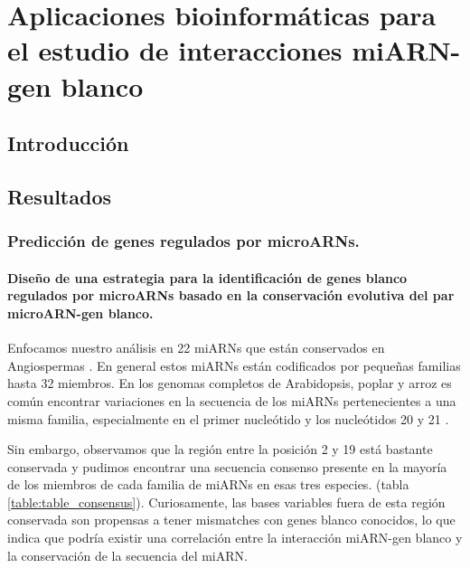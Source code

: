 
\chapter{Aplicaciones bioinformáticas para el estudio de interacciones miARN-gen blanco} 

\ifpdf
    \graphicspath{{Chapter1/Figs/Raster/}{Chapter1/Figs/PDF/}{Chapter1/Figs/}}
\else
    \graphicspath{{Chapter1/Figs/Vector/}{Chapter1/Figs/}}
\fi

\section{Introducción}


\section{Resultados} 

\subsection{Predicción de genes regulados por microARNs.} %
\subsubsection{Diseño de una estrategia para la identificación de genes blanco regulados por microARNs basado en la conservación evolutiva del par microARN-gen blanco.}

Enfocamos nuestro análisis en 22 miARNs que están conservados en Angiospermas \citep{citeulike:8816489,10.1371/journal.pgen.1002419}.  En general estos miARNs están codificados por pequeñas familias hasta 32 miembros. En los genomas completos de Arabidopsis, poplar y arroz es común encontrar variaciones en la secuencia de los miARNs pertenecientes a una misma familia, especialmente en el primer nucleótido y los nucleótidos 20 y 21 \citep{10.1371/journal.pgen.1002419}.

Sin embargo, observamos que la región entre la posición 2 y 19 está bastante conservada y pudimos encontrar una secuencia consenso presente en la mayoría de los miembros de cada familia de miARNs en esas tres especies. (tabla \ref{table:table_consensus}).
Curiosamente, las bases variables fuera de esta región conservada son propensas a tener mismatches con genes blanco conocidos, lo que indica que podría existir una correlación entre la interacción miARN-gen blanco y la conservación de la secuencia del miARN.

